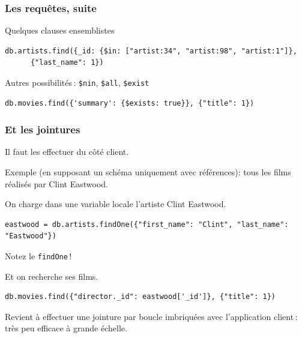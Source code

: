 \begin{frame}[fragile]
\frametitle{Les requêtes, suite}

Quelques clauses ensemblistes 

\begin{verbatim}
db.artists.find({_id: {$in: ["artist:34", "artist:98", "artist:1"]}, 
      {"last_name": 1})
\end{verbatim}

Autres possibilités\,: \texttt{\$nin}, \texttt{\$all}, \texttt{\$exist}

\begin{verbatim}
db.movies.find({'summary': {$exists: true}}, {"title": 1})
\end{verbatim}

\end{frame}



\begin{frame}[fragile]
\frametitle{Et les jointures}

Il faut les effectuer du \alert{côté client}. 

\vfill
Exemple (en supposant un schéma uniquement avec références): tous les films
réalisés par Clint Eastwood.

\vfill

On charge dans une variable \alert{locale} l'artiste Clint Eastwood.

\begin{verbatim}
eastwood = db.artists.findOne({"first_name": "Clint", "last_name": "Eastwood"})
\end{verbatim}

Notez le \texttt{findOne}\,!

\vfill

Et on recherche ses films.

\begin{verbatim}
db.movies.find({"director._id": eastwood['_id']}, {"title": 1})
\end{verbatim}
\vfill

Revient à effectuer une jointure par boucle imbriquées avec l'application client\,: 
très peu efficace à grande échelle.


\end{frame}

